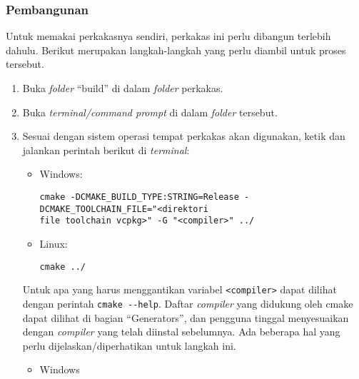 \subsubsection{Pembangunan}
\label{sec:testing-implementation-usage-build}

Untuk memakai perkakasnya sendiri, perkakas ini perlu dibangun terlebih dahulu. Berikut merupakan langkah-langkah yang perlu diambil untuk proses tersebut.

\begin{enumerate}
	\item Buka \textit{folder} ``build'' di dalam \textit{folder} perkakas.
	\item Buka \textit{terminal/command prompt} di dalam \textit{folder} tersebut.
	\item Sesuai dengan sistem operasi tempat perkakas akan digunakan, ketik dan jalankan perintah berikut di \textit{terminal}:
	
	\begin{itemize}
		\item Windows:
		\begin{verbatim}
cmake -DCMAKE_BUILD_TYPE:STRING=Release -DCMAKE_TOOLCHAIN_FILE="<direktori
file toolchain vcpkg>" -G "<compiler>" ../
		\end{verbatim}
	
		\item Linux:
		\begin{verbatim}
cmake ../
		\end{verbatim}
	\end{itemize}		

	Untuk apa yang harus menggantikan variabel \verb|<compiler>| dapat dilihat dengan perintah \verb|cmake --help|. Daftar \textit{compiler} yang didukung oleh cmake dapat dilihat di bagian \mbox{``Generators''}, dan pengguna tinggal menyesuaikan dengan \textit{compiler} yang telah diinstal sebelumnya.  Ada beberapa hal yang perlu dijelaskan/diperhatikan untuk langkah ini.
	
	\begin{itemize}
		\item Windows
			

\end{itemize}
\end{enumerate}

